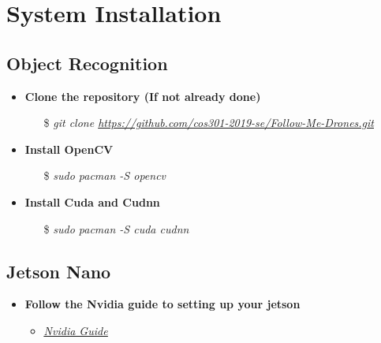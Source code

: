 \chapter{System Installation}

\section{Object Recognition}
\begin{itemize}
    \item \textbf{Clone the repository (If not already done)}
        \begin{itemize}
            \item[\$] \textit{git clone \url{https://github.com/cos301-2019-se/Follow-Me-Drones.git}}
        \end{itemize}
    \item \textbf{Install OpenCV}
        \begin{itemize}
            \item[\$] \textit{sudo pacman -S opencv}
        \end{itemize}
    \item \textbf{Install Cuda and Cudnn}
        \begin{itemize}
            \item[\$] \textit{sudo pacman -S cuda cudnn}
        \end{itemize}
\end{itemize}

\section{Jetson Nano}
\begin{itemize}
    \item \textbf{Follow the Nvidia guide to setting up your jetson}
        \begin{itemize}
            \item \href{https://developer.nvidia.com/embedded/learn/get-started-jetson-nano-devkit}{\textit{\underline{Nvidia Guide}}}
        \end{itemize}
\end{itemize}

